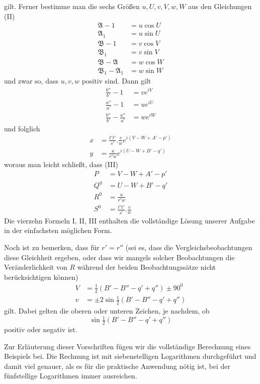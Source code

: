 gilt. Ferner bestimme man die sechs Größen $u,U,v,V,w,W$ aus den Gleichungen (II)
\[
\begin{aligned}
\mathfrak{A}-1&=u\cos U\\
\mathfrak{A}_1&=u\sin U\\
\mathfrak{B}-1&=v\cos V\\
\mathfrak{B}_1&=v\sin V\\
\mathfrak{B}-\mathfrak{A}&=w\cos W\\
\mathfrak{B}_1-\mathfrak{A}_1&=w\sin W
\end{aligned}
\]
und zwar so, dass $u,v,w$ positiv sind. Dann gilt
\[
\begin{aligned}
\frac{b''}{b'}-1&=ve^{iV}\\
\frac{a''}{a'}-1&=ue^{iU}\\
\frac{b''}{b'}-\frac{a''}{a'}&=we^{iW}
\end{aligned}
\]
und folglich
\[
\begin{aligned}
x&=\frac{t't'}{s'}.\frac{v}{w}e^{i(V-W+A'-p')}\\
y&=\frac{u}{r'w}e^{i(U-W+B'-q')}
\end{aligned}
\]
woraus man leicht schließt, dass (III)
\[
\begin{aligned}
P&=V-W+A'-p'\\
Q^0&=U-W+B'-q'\\
R^0&=\frac{u}{r'w}\\
S^0&=\frac{t't'}{s'}.\frac{v}{w}
\end{aligned}
\]
Die vierzehn Formeln I, II, III enthalten die vollständige Lösung unserer Aufgabe in der einfachsten möglichen Form.

Noch ist zu bemerken, dass für $r'=r''$ (sei es, dass die Vergleichsbeobachtungen diese Gleichheit ergeben, oder dass wir mangels solcher Beobachtungen die Veränderlichkeit von $R$ während der beiden Beobachtungssätze nicht berücksichtigen können)
\[
\begin{aligned}
V&=\tfrac12(B'-B''-q'+q'')\pm90^0\\
v&=\pm2\sin\tfrac12(B'-B''-q'+q'')
\end{aligned}
\]
gilt. Dabei gelten die oberen oder unteren Zeichen, je nachdem, ob
\[
\sin\tfrac12(B'-B''-q'+q'')
\]
positiv oder negativ ist.

Zur Erläuterung dieser Vorschriften fügen wir die vollständige Berechnung eines Beispiels bei. Die Rechnung ist mit siebenstelligen Logarithmen durchgeführt und damit viel genauer, als es für die praktische Anwendung nötig ist, bei der fünfstellige Logarithmen immer ausreichen.

